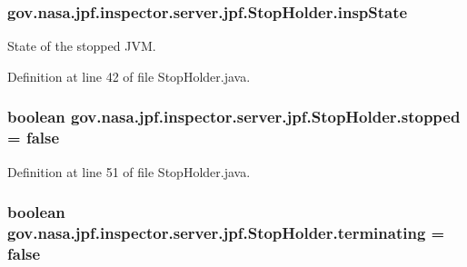 \subsubsection[{\texorpdfstring{insp\+State}{inspState}}]{ gov.\+nasa.\+jpf.\+inspector.\+server.\+jpf.\+Stop\+Holder.\+insp\+State\hspace{0.3cm}{\ttfamily [private]}}\hypertarget{classgov_1_1nasa_1_1jpf_1_1inspector_1_1server_1_1jpf_1_1_stop_holder_a9fe94c33b32604112b8cf9bc0a72f401}{}\label{classgov_1_1nasa_1_1jpf_1_1inspector_1_1server_1_1jpf_1_1_stop_holder_a9fe94c33b32604112b8cf9bc0a72f401}


State of the stopped J\+VM. 



Definition at line 42 of file Stop\+Holder.\+java.

\subsubsection[{\texorpdfstring{stopped}{stopped}}]{\setlength{\rightskip}{0pt plus 5cm}boolean gov.\+nasa.\+jpf.\+inspector.\+server.\+jpf.\+Stop\+Holder.\+stopped = false\hspace{0.3cm}{\ttfamily [private]}}\hypertarget{classgov_1_1nasa_1_1jpf_1_1inspector_1_1server_1_1jpf_1_1_stop_holder_ae8b0a8ec5e2dc3c3f38a8525ebcceb6b}{}\label{classgov_1_1nasa_1_1jpf_1_1inspector_1_1server_1_1jpf_1_1_stop_holder_ae8b0a8ec5e2dc3c3f38a8525ebcceb6b}


Definition at line 51 of file Stop\+Holder.\+java.

\subsubsection[{\texorpdfstring{terminating}{terminating}}]{\setlength{\rightskip}{0pt plus 5cm}boolean gov.\+nasa.\+jpf.\+inspector.\+server.\+jpf.\+Stop\+Holder.\+terminating = false\hspace{0.3cm}{\ttfamily [private]}}\hypertarget{classgov_1_1nasa_1_1jpf_1_1inspector_1_1server_1_1jpf_1_1_stop_holder_aa7cffa6127510e49385ce5dce81b1878}{}\label{classgov_1_1nasa_1_1jpf_1_1inspector_1_1server_1_1jpf_1_1_stop_holder_aa7cffa6127510e49385ce5dce81b1878}



